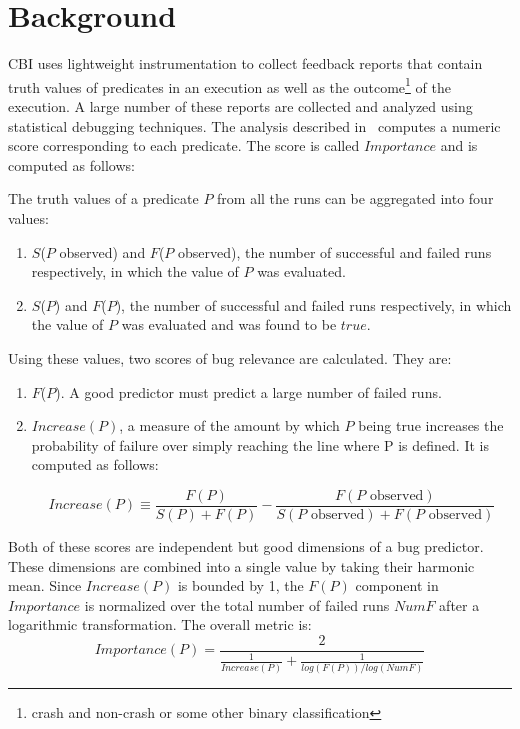 \section{Background}
\label{sec-bground}
CBI uses lightweight instrumentation to collect feedback reports that contain truth values of predicates in an execution as well as the outcome{\footnote{crash and non-crash or some other binary classification}} of the execution.  A large number of these reports are collected and analyzed using statistical debugging techniques.  The analysis described in~\cite{Liblit:2005:SSBI} computes a numeric score corresponding to each predicate.  The score is called $Importance$ and is computed as follows:

The truth values of a predicate $P$ from all the runs can be aggregated into four values:

\begin{enumerate}
\item $S$($P$ observed) and $F$($P$ observed), the number of successful and failed runs respectively, in which the value of $P$ was evaluated.
\item $S$($P$) and $F$($P$), the number of successful and failed runs respectively, in which the value of $P$ was evaluated and was found to be $true$.
\end{enumerate}

Using these values, two scores of bug relevance are calculated.  They are:
\begin{enumerate}
\item $F$($P$).  A good predictor must predict a large number of failed runs.
\item $Increase(P)$, a measure of the amount by which $P$ being true increases the probability of failure over simply reaching the line where P is defined.  It is computed as follows:

\begin{equation}
\label{eqn1}
Increase(P) \equiv 
\frac{F(P)}{S(P) + F(P)}
-
\frac{F(\text{$P$ observed})}{S(\text{$P$ observed}) +
  F(\text{$P$ observed})}
\end{equation}
\end{enumerate}

Both of these scores are independent but good dimensions of a bug predictor.  These dimensions are combined into a single value by taking their harmonic mean.  Since $Increase(P)$ is bounded by 1, the $F(P)$ component in $Importance$ is normalized over the total number of failed runs $NumF$ after a logarithmic transformation.  The overall metric is:
\begin{equation}
\label{eqn2}
Importance(P) =
\frac{2}{
  \frac{1}{Increase(P)}
  +
  \frac{1}{log(F(P)) / log(NumF)}}
\end{equation}

